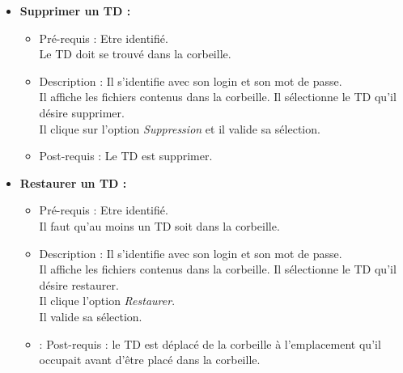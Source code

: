 \begin{itemize}
\item {\bf Supprimer un TD :}
	\begin{itemize}
	\item Pr{\'e}-requis : Etre identifi{\'e}.\\
	Le TD doit se trouv{\'e} dans la corbeille.
	\item Description : Il s'identifie avec son login et son mot de passe.\\
	Il affiche les fichiers contenus dans la corbeille. Il s{\'e}lectionne le TD qu'il d{\'e}sire supprimer.\\
	Il clique sur l'option {\it Suppression} et il valide sa s{\'e}lection.
	\item Post-requis : Le TD est supprimer.\\
	\end{itemize}

\item {\bf Restaurer un TD :}
	\begin{itemize}
	\item Pr{\'e}-requis : Etre identifi{\'e}.\\
	Il faut qu'au moins un TD soit dans la corbeille.
	\item Description : Il s'identifie avec son login et son mot de passe.\\
	Il affiche les fichiers contenus dans la corbeille. Il s{\'e}lectionne le TD qu'il d{\'e}sire restaurer.\\
	Il clique l'option {\it Restaurer}.\\
	Il valide sa s{\'e}lection.
	\item : Post-requis : le TD est d{\'e}plac{\'e} de la corbeille {\`a} l'emplacement qu'il occupait avant d'{\^e}tre plac{\'e} dans la corbeille.\\
	\end{itemize}
\end{itemize}


